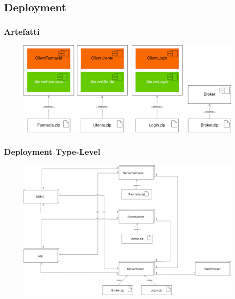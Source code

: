 \newpage

\subsection{Deployment}

\subsubsection{Artefatti}

\begin{figure}[h!]
    \begin{center}
        \includegraphics[width=\textwidth]{immagini/Deployment-Artefatti.jpg}
    \end{center}
\end{figure}

\subsubsection{Deployment Type-Level}

\begin{figure}[h!]
    \begin{center}
        \includegraphics[width=\textwidth]{immagini/Deployment-TypeLevel.jpg}
    \end{center}
\end{figure}
